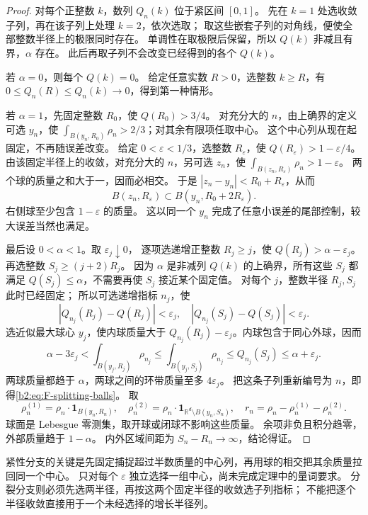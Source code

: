 \begin{proof}
对每个正整数 \(k\)，数列 \(Q_n(k)\) 位于紧区间 \([0,1]\)。
先在 \(k=1\) 处选收敛子列，再在该子列上处理 \(k=2\)，依次选取；
取这些嵌套子列的对角线，便使全部整数半径上的极限同时存在。
单调性在取极限后保留，所以 \(Q(k)\) 非减且有界，\(\alpha\) 存在。
此后再取子列不会改变已经得到的各个 \(Q(k)\)。

若 \(\alpha=0\)，则每个 \(Q(k)=0\)。
给定任意实数 \(R>0\)，选整数 \(k\ge R\)，有
\(0\le Q_n(R)\le Q_n(k)\to0\)，得到第一种情形。

若 \(\alpha=1\)，先固定整数 \(R_0\)，使 \(Q(R_0)>3/4\)。
对充分大的 \(n\)，由上确界的定义可选 \(y_n\)，使
\(\int_{B(y_n,R_0)}\rho_n>2/3\)；对其余有限项任取中心。
这个中心列从现在起固定，不再随误差改变。
给定 \(0<\varepsilon<1/3\)，选整数 \(R_\varepsilon\)，使
\(Q(R_\varepsilon)>1-\varepsilon/4\)。
由该固定半径上的收敛，对充分大的 \(n\)，另可选 \(z_n\)，使
\(\int_{B(z_n,R_\varepsilon)}\rho_n>1-\varepsilon\)。
两个球的质量之和大于一，因而必相交。
于是 \(|z_n-y_n|<R_0+R_\varepsilon\)，从而
\[
 B(z_n,R_\varepsilon)\subset B(y_n,R_0+2R_\varepsilon).
\]
右侧球至少包含 \(1-\varepsilon\) 的质量。
这以同一个 \(y_n\) 完成了任意小误差的尾部控制，较大误差当然也满足。

最后设 \(0<\alpha<1\)。取 \(\varepsilon_j\downarrow0\)，
逐项选递增正整数 \(R_j\ge j\)，使 \(Q(R_j)>\alpha-\varepsilon_j\)。
再选整数 \(S_j\ge(j+2)R_j\)。
因为 \(\alpha\) 是非减列 \(Q(k)\) 的上确界，所有这些 \(S_j\) 都满足
\(Q(S_j)\le\alpha\)，不需要再使 \(S_j\) 接近某个固定值。
对每个 \(j\)，整数半径 \(R_j,S_j\) 此时已经固定；
所以可选递增指标 \(n_j\)，使
\[
 |Q_{n_j}(R_j)-Q(R_j)|<\varepsilon_j,
 \quad |Q_{n_j}(S_j)-Q(S_j)|<\varepsilon_j.
\]
选近似最大球心 \(y_j\)，使内球质量大于
\(Q_{n_j}(R_j)-\varepsilon_j\)。内球包含于同心外球，因而
\[
 \alpha-3\varepsilon_j
 <\int_{B(y_j,R_j)}\rho_{n_j}
 \le\int_{B(y_j,S_j)}\rho_{n_j}
 \le Q_{n_j}(S_j)
 \le\alpha+\varepsilon_j.
\]
两球质量都趋于 \(\alpha\)，两球之间的环带质量至多 \(4\varepsilon_j\)。
把这条子列重新编号为 \(n\)，即得\eqref{b2:eq:F-splitting-balls}。
取
\[
 \rho_n^{(1)}=\rho_n\cdot\mathbf1_{B(y_n,R_n)},
 \quad
 \rho_n^{(2)}=\rho_n\cdot\mathbf1_{\mathbb R^d\setminus B(y_n,S_n)},
 \quad r_n=\rho_n-\rho_n^{(1)}-\rho_n^{(2)}.
\]
球面是 Lebesgue 零测集，取开球或闭球不影响这些质量。
余项非负且积分趋零，外部质量趋于 \(1-\alpha\)。
内外区域间距为 \(S_n-R_n\to\infty\)，结论得证。
\end{proof}
紧性分支的关键是先固定捕捉超过半数质量的中心列，再用球的相交把其余质量拉回同一个中心。
只对每个 \(\varepsilon\) 独立选择一组中心，尚未完成定理中的量词要求。
分裂分支则必须先选两半径，再按这两个固定半径的收敛选子列指标；
不能把逐个半径收敛直接用于一个未经选择的增长半径列。

